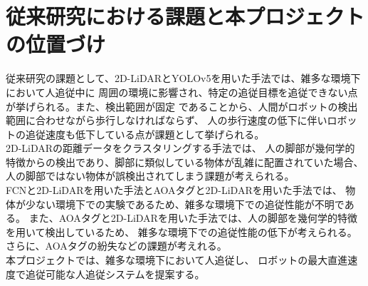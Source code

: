 \clearpage

\section{従来研究における課題と本プロジェクトの位置づけ}
従来研究の課題として、2D-LiDARとYOLOv5を用いた手法では、雑多な環境下において人追従中に
周囲の環境に影響され、特定の追従目標を追従できない点が挙げられる。また、検出範囲が固定
であることから、人間がロボットの検出範囲に合わせながら歩行しなければならず、
人の歩行速度の低下に伴いロボットの追従速度も低下している点が課題として挙げられる。\\ \indent
2D-LiDARの距離データをクラスタリングする手法では、
人の脚部が幾何学的特徴からの検出であり、脚部に類似している物体が乱雑に配置されていた場合、
人の脚部ではない物体が誤検出されてしまう課題が考えられる。\\ \indent
FCNと2D-LiDARを用いた手法とAOAタグと2D-LiDARを用いた手法では、
物体が少ない環境下での実験であるため、雑多な環境下での追従性能が不明である。
また、AOAタグと2D-LiDARを用いた手法では、人の脚部を幾何学的特徴を用いて検出しているため、
雑多な環境下での追従性能の低下が考えられる。さらに、AOAタグの紛失などの課題が考えれる。\\ \indent
本プロジェクトでは、雑多な環境下において人追従し、
ロボットの最大直進速度で追従可能な人追従システムを提案する。